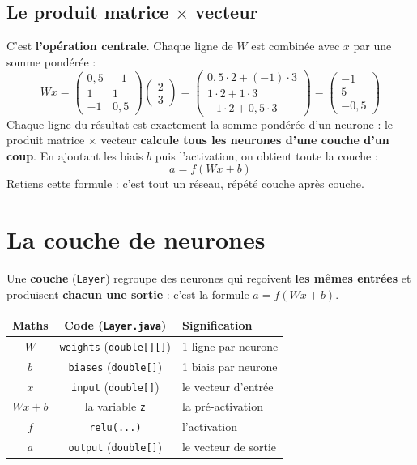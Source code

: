 \documentclass[11pt]{article}
\begin{document}
\subsection{Le produit matrice $\times$ vecteur}
C'est \textbf{l'opération centrale}. Chaque ligne de $W$ est combinée avec $x$ par
une somme pondérée :
\[
Wx =
\begin{pmatrix} 0{,}5 & -1 \\ 1 & 1 \\ -1 & 0{,}5 \end{pmatrix}
\begin{pmatrix} 2 \\ 3 \end{pmatrix}
=
\begin{pmatrix} 0{,}5\cdot 2 + (-1)\cdot 3 \\ 1\cdot 2 + 1\cdot 3 \\ -1\cdot 2 + 0{,}5\cdot 3 \end{pmatrix}
=
\begin{pmatrix} -1 \\ 5 \\ -0{,}5 \end{pmatrix}
\]
Chaque ligne du résultat est exactement la somme pondérée d'un neurone : le
produit matrice $\times$ vecteur \textbf{calcule tous les neurones d'une couche
d'un coup}. En ajoutant les biais $b$ puis l'activation, on obtient toute la
couche :
\[
\boxed{\,a = f(Wx + b)\,}
\]
Retiens cette formule : c'est tout un réseau, répété couche après couche.

\section{La couche de neurones}

Une \textbf{couche} (\texttt{Layer}) regroupe des neurones qui reçoivent
\textbf{les mêmes entrées} et produisent \textbf{chacun une sortie} : c'est la
formule $a = f(Wx + b)$.

\begin{center}
\begin{tabular}{c c l}
\toprule
\textbf{Maths} & \textbf{Code (\texttt{Layer.java})} & \textbf{Signification} \\
\midrule
$W$        & \texttt{weights} (\texttt{double[][]}) & 1 ligne par neurone \\
$b$        & \texttt{biases} (\texttt{double[]})    & 1 biais par neurone \\
$x$        & \texttt{input} (\texttt{double[]})     & le vecteur d'entrée \\
$Wx+b$     & la variable \texttt{z}                 & la pré-activation \\
$f$        & \texttt{relu(...)}                     & l'activation \\
$a$        & \texttt{output} (\texttt{double[]})    & le vecteur de sortie \\
\bottomrule
\end{tabular}
\end{center}
\end{document}
